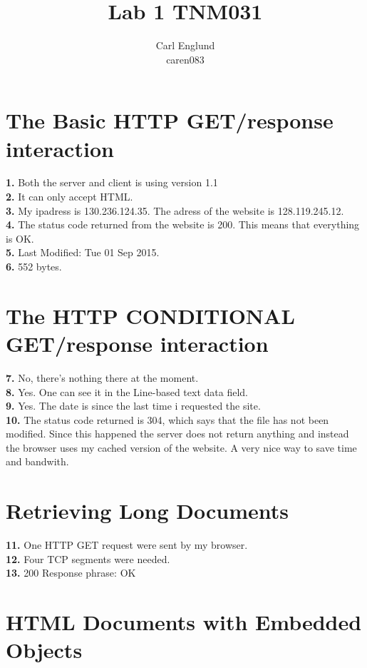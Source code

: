 \documentclass[a4paper, 12pt, titlepage]{article}
\title{Lab 1 TNM031}
\author{Carl Englund \\ caren083}
\begin{document}
\maketitle %

\section{The Basic HTTP GET/response interaction}
	\textbf{1.} Both the server and client is using version 1.1
	\\\textbf{2.} It can only accept HTML.
	\\\textbf{3.} My ipadress is 130.236.124.35. The adress of the website is 128.119.245.12.
	\\\textbf{4.} The status code returned from the website is 200. This means that everything is OK.
	\\\textbf{5.} Last Modified: Tue 01 Sep 2015.
	\\\textbf{6.} 552 bytes.


\section{The HTTP CONDITIONAL GET/response interaction}

	\textbf{7.} No, there's nothing there at the moment.
	\\\textbf{8.} Yes. One can see it in the Line-based text data field.
	\\\textbf{9.} Yes. The date is since the last time i requested the site.
	\\\textbf{10.} The status code returned is 304, which says that the file has not been modified. Since this happened the server does not return anything and instead the browser uses my cached version of the website. A very nice way to save time and bandwith.

\section{Retrieving Long Documents}

	\textbf{11.} One HTTP GET request were sent by my browser.
	\\\textbf{12.} Four TCP segments were needed.
	\\\textbf{13.} 200 Response phrase: OK
	
\section{HTML Documents with Embedded Objects}
\end{document}
